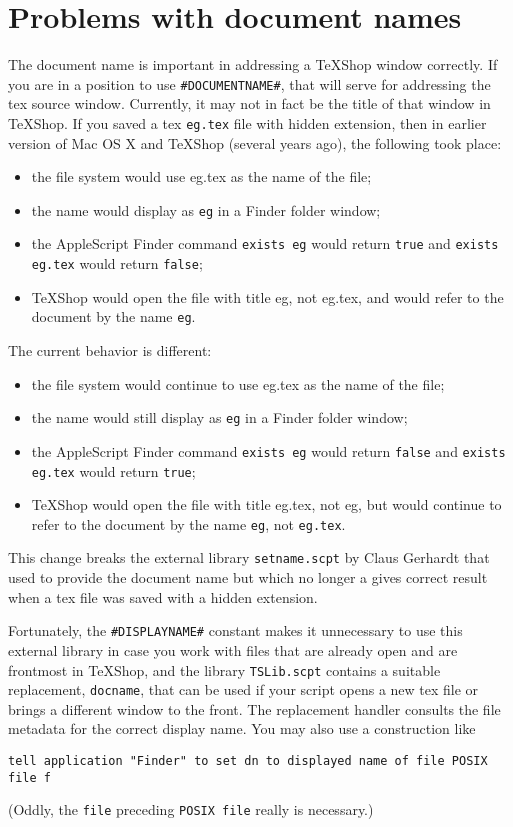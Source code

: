 \documentclass[11pt]{amsart}
\begin{document}
\section{Problems with document names} %
The document name is important in addressing a TeXShop window correctly. If you are in a position to use \verb|#DOCUMENTNAME#|, that will serve  for addressing the tex source window. Currently, it may not in fact be the title of that window in TeXShop. If you saved a tex {\tt eg.tex} file with hidden extension, then in earlier version of Mac OS X and TeXShop (several years ago), the following took place:
\begin{itemize}
\item
the file system would use {eg.tex} as the name of the file;
\item the name would display as {\tt eg} in a Finder folder window;
\item the AppleScript Finder command {\tt exists eg} would return {\tt true} and {\tt exists eg.tex} would return {\tt false};
\item TeXShop would open the file with title \textsf{eg}, not \textsf{eg.tex}, and would refer to the document by the name {\tt eg}.
\end{itemize}
The current behavior is different:
\begin{itemize}
\item
the file system would continue to use {eg.tex} as the name of the file;
\item the name would still display as {\tt eg} in a Finder folder window;
\item the AppleScript Finder command {\tt exists eg} would return {\tt false} and {\tt exists eg.tex} would return {\tt true};
\item TeXShop would open the file with title \textsf{eg.tex}, not \textsf{eg}, but would continue to refer to the document by the name {\tt eg}, not {\tt eg.tex}.
\end{itemize}
This change breaks
the external library {\tt setname.scpt} by Claus Gerhardt that used to provide the document name but which no longer a gives correct result when a tex file was saved with a hidden extension. 

Fortunately, the \verb|#DISPLAYNAME#| constant makes it unnecessary to use this external library in case you work with files that are already open and are frontmost in TeXShop, and the library {\tt TSLib.scpt} contains a suitable replacement, {\tt docname}, that can be used if your script opens a new tex file or brings a different window to the front. The replacement handler consults the file metadata for the correct display name. You may also use a construction like
\begin{verbatim}
tell application "Finder" to set dn to displayed name of file POSIX file f
\end{verbatim}
(Oddly, the {\tt file} preceding {\tt POSIX file} really is necessary.)
\end{document}
